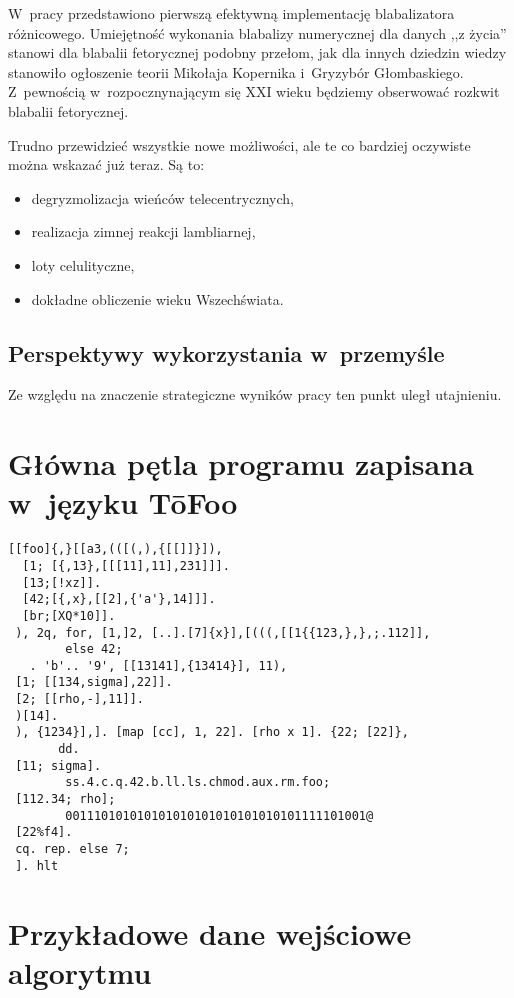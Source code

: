 \documentclass{pracamgr}
\begin{document}
W~pracy przedstawiono pierwszą efektywną implementację blabalizatora
różnicowego.  Umiejętność wykonania blabalizy numerycznej dla danych
,,z życia'' stanowi dla blabalii fetorycznej podobny przełom, jak dla
innych dziedzin wiedzy stanowiło ogłoszenie teorii Mikołaja Kopernika
i~Gryzybór Głombaskiego.  Z~pewnością w~rozpocznynającym się XXI wieku
będziemy obserwować rozkwit blabalii fetorycznej.

Trudno przewidzieć wszystkie nowe możliwości, ale te co bardziej
oczywiste można wskazać już teraz.  Są to:
\begin{itemize}
\item degryzmolizacja wieńców telecentrycznych,
\item realizacja zimnej reakcji lambliarnej,
\item loty celulityczne,
\item dokładne obliczenie wieku Wszechświata.
\end{itemize}

\section{Perspektywy wykorzystania w~przemyśle}

Ze względu na znaczenie strategiczne wyników pracy ten punkt uległ
utajnieniu.

\appendix

\chapter{Główna pętla programu zapisana w~języku T\=oFoo}

\begin{verbatim}
[[foo]{,}[[a3,(([(,),{[[]]}]),
  [1; [{,13},[[[11],11],231]]].
  [13;[!xz]].
  [42;[{,x},[[2],{'a'},14]]].
  [br;[XQ*10]].
 ), 2q, for, [1,]2, [..].[7]{x}],[(((,[[1{{123,},},;.112]],
        else 42;
   . 'b'.. '9', [[13141],{13414}], 11),
 [1; [[134,sigma],22]].
 [2; [[rho,-],11]].
 )[14].
 ), {1234}],]. [map [cc], 1, 22]. [rho x 1]. {22; [22]},
       dd.
 [11; sigma].
        ss.4.c.q.42.b.ll.ls.chmod.aux.rm.foo;
 [112.34; rho];
        001110101010101010101010101010101111101001@
 [22%f4].
 cq. rep. else 7;
 ]. hlt
\end{verbatim}

\chapter{Przykładowe dane wejściowe algorytmu}
\end{document}
